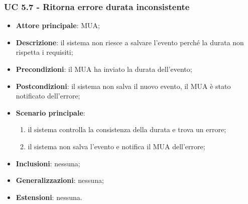     \subsubsection{UC 5.7 - Ritorna errore durata inconsistente} \label{sec:UC5.7}
    \begin{itemize}
        \item \textbf{Attore principale}: MUA;
        \item \textbf{Descrizione}: il sistema non riesce a salvare l'evento perché la durata non rispetta i requisiti;
        \item \textbf{Precondizioni}: il MUA ha inviato la durata dell'evento;
        \item \textbf{Postcondizioni}: il sistema non salva il nuovo evento, il MUA è stato notificato dell'errore;
        \item \textbf{Scenario principale}:
            \begin{enumerate}
                \item il sistema controlla la consistenza della durata e trova un errore;
                \item il sistema non salva l'evento e notifica il MUA dell'errore;
            \end{enumerate}
        \item \textbf{Inclusioni}: nessuna;
        \item \textbf{Generalizzazioni}: nessuna;
        \item \textbf{Estensioni}: nessuna.
    \end{itemize}
